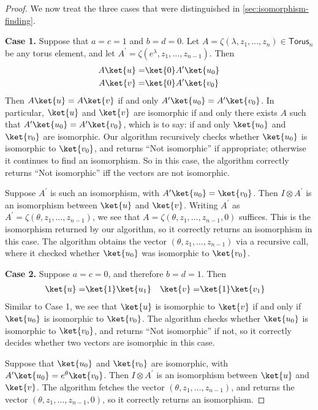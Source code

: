 \begin{proof}
	We now treat the three cases that were distinguished in \autoref{sec:isomorphism-finding}.
	
	\textbf{Case 1. } Suppose that $a=c=1$ and $b=d=0$.
	Let $A=\zeta(\lambda, z_1,\ldots, z_n)\in \textsf{Torus}_n$ be any torus element, and let $A^\prime=\zeta(e^\lambda, z_1,\ldots, z_{n-1})$. Then
	\begin{align}
		A\ket{u}=&\ket{0}A^\prime \ket{u_0} \\
		A\ket{v}=&\ket{0}A^\prime\ket{v_0}
	\end{align}
	Then $A\ket{u}=A\ket{v}$ if and only $A^\prime\ket{u_0}=A^\prime\ket{v_0}$.
	In particular, $\ket{u}$ and $\ket{v}$ are isomorphic if and only there exists $A$ such that $A^\prime\ket{u_0}=A^\prime\ket{v_0}$, which is to say: if and only $\ket{u_0}$ and $\ket{v_0}$ are isomorphic.
	Our algorithm recursively checks whether $\ket{u_0}$ is isomorphic to $\ket{v_0}$, and returns ``Not isomorphic'' if appropriate; otherwise it continues to find an isomorphism.
	So in this case, the algorithm correctly returns ``Not isomorphic'' iff the vectors are not isomorphic.
	
	Suppose $A^\prime$ is such an isomorphism, with $A^\prime\ket{u_0}=\ket{v_0}$.
	Then $I\otimes A^\prime$ is an isomorphism between $\ket{u}$ and $\ket{v}$.
	Writing $A^\prime$ as $A^\prime=\zeta(\theta,z_1,\ldots, z_{n-1})$, we see that $A=\zeta(\theta,z_1,\ldots,z_{n-1},0)$ suffices.
	This is the isomorphism returned by our algorithm, so it correctly returns an isomorphism in this case.
	The algorithm obtains the vector $(\theta,z_1,\ldots, z_{n-1})$ via a recursive call, where it checked whether $\ket{u_0}$ was isomorphic to $\ket{v_0}$.
	
	\textbf{Case 2. } Suppose $a=c=0$, and therefore $b=d=1$.
	Then
	\begin{align}
		\ket{u}=& \ket{1}\ket{u_1} &
		\ket{v}=& \ket{1}\ket{v_1}
	\end{align}
	Similar to Case 1, we see that $\ket{u}$ is isomorphic to $\ket{v}$ if and only if $\ket{u_0}$ is isomorphic to $\ket{v_0}$.
	The algorithm checks whether $\ket{u_0}$ is isomorphic to $\ket{v_0}$, and returns ``Not isomorphic'' if not, so it correctly decides whether two vectors are isomorphic in this case.
	
	Suppose that $\ket{u_0}$ and $\ket{v_0}$ are isomorphic, with $A^\prime\ket{u_0}=e^\theta\ket{v_0}$.
	Then $I\otimes A^\prime$ is an isomorphism between $\ket{u}$ and $\ket{v}$.
	The algorithm fetches the vector $(\theta,z_1,\ldots, z_{n-1})$, and returns the vector $(\theta,z_1,\ldots, z_{n-1},0)$, so it correctly returns an isomorphism.
	

\end{proof}

